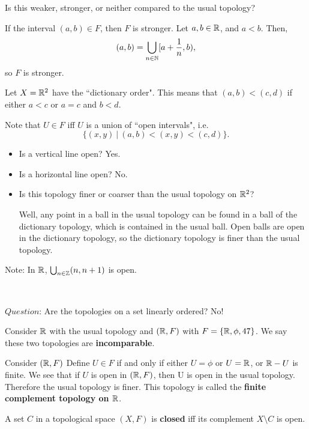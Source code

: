 Is this weaker, stronger, or neither compared to the usual topology?

If the interval $(a,b) \in F$, then $F$ is stronger. Let $a,b \in \mathbb R$, and $a<b$. Then,
\[(a,b)=\bigcup_{n\in \mathbb N}[a+\frac{1}{n},b),\]
so $F$ is stronger. 
\begin{example}
	Let $X=\mathbb R^{2}$ have the ``dictionary order". This means that $(a,b)<(c,d)$ if either $a<c$ or $a=c$ and $b<d$. 
\end{example}

Note that $U\in F$ iff $U$ is a union of ``open intervals", i.e.
\[\{(x,y)\ |\ (a,b)<(x,y)<(c,d)\}.\]
\begin{itemize}
	\item Is a vertical line open? Yes. 
	\item Is a horizontal line open? No. 
	\item Is this topology finer or coarser than the usual topology on $\mathbb R^{2}$?
	
	Well, any point in a ball in the usual topology can be found in a ball of the dictionary topology, which is contained in the usual ball. Open balls are open in the dictionary topology, so the dictionary topology is finer than the usual topology. 
\end{itemize}

Note: In $\mathbb R$, $\bigcup_{n\in \mathbb Z}(n,n+1)$ is open.

\mbox{ }

$Question$: Are the topologies on a set linearly ordered? No! 
\begin{example}
	Consider $\mathbb R$ with the usual topology and $(\mathbb R, F)$ with $F = \left\{ \mathbb R, \phi,47 \right\}$. We say these two topologies are \textbf{incomparable}. 
\end{example}
\begin{example}
	Consider $(\mathbb R,F)$ Define $U \in F$ if and only if either $U=\phi$ or $U=\mathbb R$, or $\mathbb R-U$ is finite. We see that if $U$ is open in $(\mathbb R,F)$, then U is open in the usual topology. Therefore the usual topology is finer. This topology is called the \textbf{finite complement topology on $\mathbb R$}. 
\end{example}
\begin{definition}
	A set $C$ in a topological space $(X,F)$ is \textbf{closed} iff its complement $X\setminus C$ is open. 
\end{definition}

